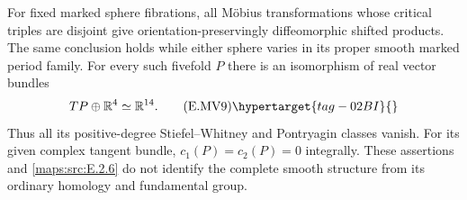 \begin{proposition}\hypertarget{tag-02MR}{}\label{maps:src:E.2.7}


For fixed marked sphere fibrations, all M\"obius transformations
whose critical triples are disjoint give orientation-preservingly
diffeomorphic shifted products. The same conclusion holds while
either sphere varies in its proper smooth marked period family.
For every such fivefold $P$ there is an isomorphism of real vector
bundles
\[
 TP\oplus\mathbb R^4\simeq\mathbb R^{14}.
 \tag{E.MV9}\hypertarget{tag-02BI}{}\label{maps:eq:E.MV9}
\]
Thus all its positive-degree Stiefel--Whitney and Pontryagin
classes vanish. For its given complex tangent bundle,
$c_1(P)=c_2(P)=0$ integrally.
These assertions and \ref{maps:src:E.2.6} do not identify the complete smooth
structure from its ordinary homology and fundamental group.
\end{proposition}


